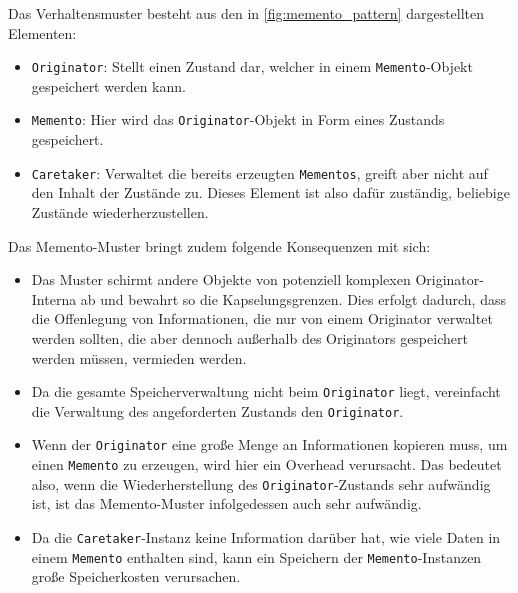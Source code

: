 Das Verhaltensmuster besteht aus den in \autoref{fig:memento_pattern} dargestellten Elementen:
\begin{itemize}
\item \texttt{Originator}: Stellt einen Zustand dar, welcher in einem \texttt{Memento}-Objekt gespeichert werden kann.
\item \texttt{Memento}: Hier wird das \texttt{Originator}-Objekt in Form eines Zustands gespeichert. 
\item \texttt{Caretaker}: Verwaltet die bereits erzeugten \texttt{Mementos}, greift aber nicht auf den Inhalt der Zustände zu. Dieses Element ist also dafür zuständig, beliebige Zustände wiederherzustellen.
\end{itemize}
Das Memento-Muster bringt zudem folgende Konsequenzen mit sich:
\begin{itemize}
\item Das Muster schirmt andere Objekte von potenziell komplexen Originator-Interna ab und bewahrt so die Kapselungsgrenzen. Dies erfolgt dadurch, dass die Offenlegung von Informationen, die nur von einem Originator verwaltet werden sollten, die aber dennoch außerhalb des Originators gespeichert werden müssen, vermieden werden.
\item Da die gesamte Speicherverwaltung nicht beim \texttt{Originator} liegt, vereinfacht die Verwaltung des angeforderten Zustands den \texttt{Originator}.
\item Wenn der \texttt{Originator} eine große Menge an Informationen kopieren muss, um einen \texttt{Memento} zu erzeugen, wird hier ein Overhead verursacht. Das bedeutet also, wenn die Wiederherstellung des \texttt{Originator}-Zustands sehr aufwändig ist, ist das Memento-Muster infolgedessen auch sehr aufwändig.
\item Da die \texttt{Caretaker}-Instanz keine Information darüber hat, wie viele Daten in einem \texttt{Memento} enthalten sind, kann ein Speichern der \texttt{Memento}-Instanzen große Speicherkosten verursachen.
\end{itemize}


